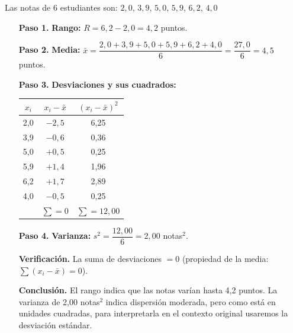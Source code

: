 \documentclass[11pt, letterpaper]{article}
\begin{document}
\begin{tcolorbox}[examplebox, title={Ej. 11. Cálculo de rango y varianza}]
Las notas de 6 estudiantes son: $2{,}0$, $3{,}9$, $5{,}0$, $5{,}9$, $6{,}2$, $4{,}0$

\begin{enumerate}[label=\textbf{\arabic*.}, leftmargin=2.8cm]
  \item[\textbf{Paso 1.}] \textbf{Rango:} $R = 6{,}2 - 2{,}0 = 4{,}2$ puntos.

  \medskip
  \item[\textbf{Paso 2.}] \textbf{Media:} $\bar{x} = \dfrac{2{,}0 + 3{,}9 + 5{,}0 + 5{,}9 + 6{,}2 + 4{,}0}{6} = \dfrac{27{,}0}{6} = 4{,}5$ puntos.

  \medskip
  \item[\textbf{Paso 3.}] \textbf{Desviaciones y sus cuadrados:}
  \begin{center}
  \renewcommand{\arraystretch}{1.2}
  \begin{tabular}{c c c}
  \toprule
  $x_i$ & $x_i - \bar{x}$ & $(x_i - \bar{x})^2$\\
  \midrule
  2{,}0 & $-2{,}5$ & 6{,}25\\
  3{,}9 & $-0{,}6$ & 0{,}36\\
  5{,}0 & $+0{,}5$ & 0{,}25\\
  5{,}9 & $+1{,}4$ & 1{,}96\\
  6{,}2 & $+1{,}7$ & 2{,}89\\
  4{,}0 & $-0{,}5$ & 0{,}25\\
  \midrule
  & $\sum = 0$ & $\sum = 12{,}00$\\
  \bottomrule
  \end{tabular}
  \end{center}

  \medskip
  \item[\textbf{Paso 4.}] \textbf{Varianza:} $s^2 = \dfrac{12{,}00}{6} = 2{,}00$ notas$^2$.

  \medskip
  \item[\textbf{Verificación.}] La suma de desviaciones $= 0$ \checkmark (propiedad de la media: $\sum(x_i-\bar{x})=0$).

  \medskip
  \item[\textbf{Conclusión.}] El rango indica que las notas varían hasta 4{,}2 puntos. La varianza de 2{,}00 notas$^2$ indica dispersión moderada, pero como está en unidades cuadradas, para interpretarla en el contexto original usaremos la desviación estándar.
\end{enumerate}
\end{tcolorbox}
\end{document}
